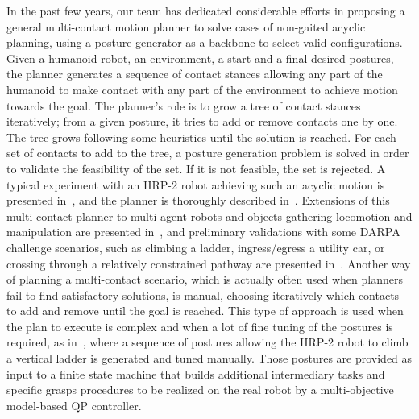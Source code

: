 In the past few years, our team has dedicated considerable efforts in proposing a general multi-contact motion planner to solve cases of non-gaited acyclic planning, using a posture generator as a backbone to select valid configurations.
Given a humanoid robot, an environment, a start and a final desired postures, the planner generates a sequence of contact stances allowing any part of the humanoid to make contact with any part of the environment to achieve motion towards the goal.
The planner's role is to grow a tree of contact stances iteratively; from a given posture, it tries to add or remove contacts one by one.
The tree grows following some heuristics until the solution is reached.
For each set of contacts to add to the tree, a posture generation problem is solved in order to validate the feasibility of the set. If it is not feasible, the set is rejected.
A typical experiment with an HRP-2 robot achieving such an acyclic motion is presented in~\cite{escande:iser:2008}, and the planner is thoroughly described in~\cite{escande:ras:2013}.
Extensions of this multi-contact planner to multi-agent robots and objects gathering locomotion and manipulation are presented in~\cite{bouyarmane:ar:2012}, and preliminary validations with some DARPA challenge scenarios, such as climbing a ladder, ingress/egress a utility car, or crossing through a relatively constrained pathway are presented in~\cite{bouyarmane:humanoids:2012}.
Another way of planning a multi-contact scenario, which is actually often used when planners fail to find satisfactory solutions, is manual, choosing iteratively which contacts to add and remove until the goal is reached.
This type of approach is used when the plan to execute is complex and when a lot of fine tuning of the postures is required, as in~\cite{vaillant:autonomousrobots:2016}, where a sequence of postures allowing the HRP-2 robot to climb a vertical ladder is generated and tuned manually.
Those postures are provided as input to a finite state machine that builds additional intermediary tasks and specific grasps procedures to be realized on the real robot by a multi-objective model-based QP controller.

